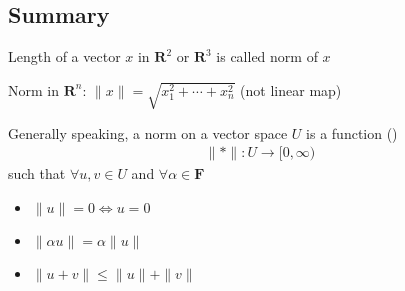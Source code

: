 \subsection*{Summary}

\begin{description}
\item Length of a vector $x$ in $\mathbf{R}^2$ or $\mathbf{R}^3$ is called norm of $x$
\item Norm in $\mathbf{R}^n$: $\|x\| = \sqrt{x_1^2+\cdots+x_n^2}$ (not linear map)
\item[Norm\label{itm:D6_norm}] Generally speaking, a norm on a vector space $U$ is a function ()
\begin{align*}
\|*\|:U\to[0,\infty)
\end{align*}
such that $\forall u,v\in U$ and $ \forall \alpha\in\mathbf{F}$
\begin{itemize}
\item $\|u\|=0 \iff u=0$
\item $\|\alpha u\|=\alpha \|u\|$
\item $\| u+v\| \leq \|u\| +\|v\|$
\end{itemize} 
 

\end{description}
